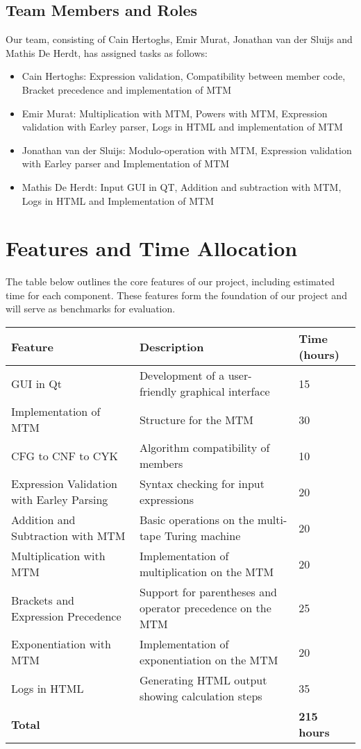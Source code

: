 \documentclass[a4paper,12pt]{article}
\begin{document}
\subsection*{Team Members and Roles}
Our team, consisting of Cain Hertoghs, Emir Murat, Jonathan van der Sluijs and Mathis De Herdt, has assigned tasks as follows:
\begin{itemize}
    \item Cain Hertoghs: Expression validation, Compatibility between member code, Bracket precedence and implementation of MTM
    \item Emir Murat: Multiplication with MTM, Powers with MTM, Expression validation with Earley parser, Logs in HTML and implementation of MTM
    \item Jonathan van der Sluijs: Modulo-operation with MTM, Expression validation with Earley parser and Implementation of MTM
    \item Mathis De Herdt: Input GUI in QT, Addition and subtraction with MTM, Logs in HTML and Implementation of MTM
\end{itemize}

\section*{Features and Time Allocation}

The table below outlines the core features of our project, including estimated time for each component. These features form the foundation of our project and will serve as benchmarks for evaluation.

\begin{longtable}{|p{5cm}|p{5cm}|p{4cm}|}
\hline
\textbf{Feature} & \textbf{Description} & \textbf{Time (hours)} \\
\hline
GUI in Qt & Development of a user-friendly graphical interface & 15 \\
\hline
Implementation of MTM & Structure for the MTM & 30 \\
\hline
CFG to CNF to CYK & Algorithm compatibility of members & 10 \\
\hline
Expression Validation with Earley Parsing & Syntax checking for input expressions &  20 \\
\hline
Addition and Subtraction with MTM & Basic operations on the multi-tape Turing machine & 20 \\
\hline
Multiplication with MTM & Implementation of multiplication on the MTM & 20 \\
\hline
Brackets and Expression Precedence & Support for parentheses and operator precedence on the MTM & 25 \\
\hline
Exponentiation with MTM & Implementation of exponentiation on the MTM & 20 \\
\hline
Logs in HTML & Generating HTML output showing calculation steps & 35 \\
\hline

\textbf{Total} & & \textbf{215 hours} \\
\hline
\end{longtable}
\end{document}
